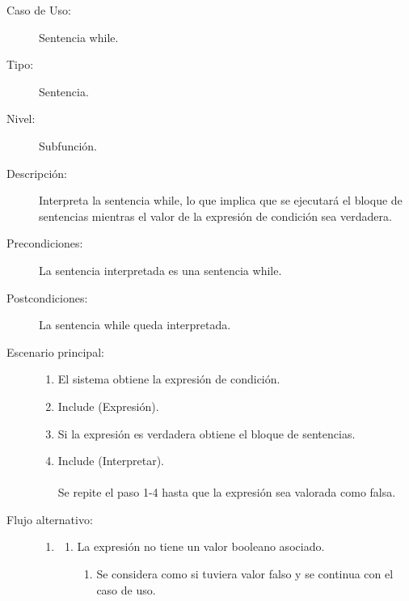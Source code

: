 \begin{framed}
\FloatBarrier
\begin{description}
   \item[Caso de Uso:]  Sentencia while.
   \item [Tipo:] Sentencia.
   \item[Nivel:]  Subfunción.
   \item[Descripción:] 
   Interpreta la sentencia while, lo que implica que se ejecutará el bloque 
   de sentencias mientras el valor de la expresión de condición sea verdadera.
   \item[Precondiciones:] 
   La sentencia interpretada es una sentencia while.
   \item[Postcondiciones:] 
   La sentencia while queda interpretada.
   \item[Escenario principal:] \hfill
   \begin{enumerate}
   \item El sistema obtiene la expresión de condición.
   \item Include (Expresión).
   \item Si la expresión es verdadera obtiene el bloque de sentencias.
   \item Include (Interpretar). \\\\ \hfill
      Se repite el paso 1-4 hasta que la expresión sea valorada como falsa.
   \end{enumerate}
   \item[Flujo alternativo:] \hfill 
   \begin{enumerate} \itemsep1pt \parskip0pt 
   \setcounter{enumi}{2}
   \renewcommand{\labelenumi}{}
   \renewcommand{\labelenumiii}{\arabic{enumiii}.}
   \renewcommand{\labelenumii}{\arabic{enumi}\alph{enumii}.}
      \item 
      \begin {enumerate}
         \setcounter{enumii}{0}
         \item La expresión no tiene un valor booleano asociado.
         \begin{enumerate}
         \item Se considera como si tuviera valor falso y se continua con el caso de uso.
         \end{enumerate}
      \end{enumerate}
   \end{enumerate}
\end{description}
 \FloatBarrier
\end{framed}
